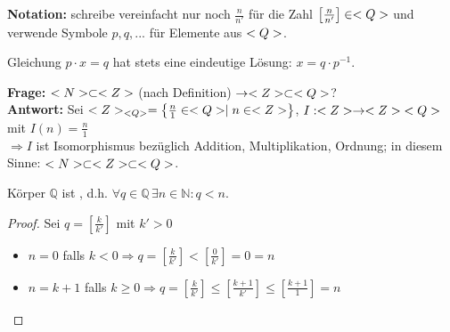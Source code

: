 \textbf{Notation:} schreibe vereinfacht nur noch $\frac{n}{n'}$ für die Zahl $\left[\frac{n}{n'}\right]
\in<Q>$ und verwende Symbole $p,q,...$ für Elemente aus $<Q>$.

Gleichung $p\cdot x=q$ hat stets eine eindeutige Lösung: $x=q\cdot p^{-1}$.

\textbf{Frage:} $<N>\subset<Z>$ (nach Definition) $\to<Z>\subset<Q>$? \\
\textbf{Antwort:} Sei $<Z>_{<Q>}=\left\lbrace \frac{n}{1}\in<Q>\mid n\in<Z>\right\rbrace$, $I:<Z>\to<Z>{<Q>}$ mit $I(n)=\frac{n}{1}$ \\
$\Rightarrow I$ ist Isomorphismus bezüglich Addition, Multiplikation, Ordnung; in diesem Sinne: $<N>\subset<Z>\subset<Q>$.

\begin{conclusion}
	Körper $\mathbb{Q}$ ist , d.h. $\forall q\in\mathbb{Q} \, \exists n\in\mathbb{N}: q < n$.
\end{conclusion}
\begin{proof}
	Sei $q=\left[ \frac{k}{k'}\right]$ mit $k'>0$
	\begin{itemize}
		\item $n=0$ falls $k<0\Rightarrow q=\left[\frac{k}{k'}\right] < \left[ \frac{0}{k'}\right] =0=n$
		\item $n=k+1$ falls $k\ge 0\Rightarrow q=\left[ \frac{k}{k'}\right] \le \left[ \frac{k+1}{k'}\right] \le \left[ \frac{k+1}{1}\right] =n$
	\end{itemize}
\end{proof}